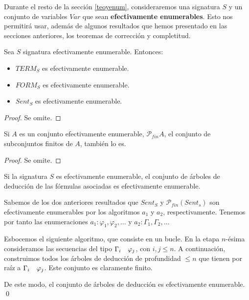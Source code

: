 Durante el resto de la sección \ref{teoyenum}, consideraremos una signatura $S$ y un conjunto de variables $Var$ que sean \textbf{efectivamente enumerables}. Esto nos permitirá usar, además de algunos resultados que hemos presentado en las secciones anteriores, los teoremas de corrección  y completitud.

\begin{lema*}\label{cosasenum}
Sea $S$ signatura efectivamente enumerable. Entonces:
\begin{itemize}
    \item $TERM_S$ es efectivamente enumerable.
    \item $FORM_S$ es efectivamente enumerable.
    \item $Sent_S$ es efectivamente enumerable.
\end{itemize}
\end{lema*}
\begin{proof}
Se omite.
\end{proof}

\begin{lema*}
Si $A$ es un conjunto efectivamente enumerable, $\mathcal{P}_{fin}A$, el conjunto de subconjuntos  finitos de $A$, también lo es.
\end{lema*}
\begin{proof}
Se omite.
\end{proof}

\begin{prop*}\label{arbenum}
Si la signatura $S$ es efectivamente enumerable, el conjunto de árboles de deducción de las fórmulas asociadas es efectivamente enumerable.
\end{prop*}
\begin{sketchproof}
Sabemos de los dos anteriores resultados que $Sent_S$ y $\mathcal{P}_{fin}(Sent_s)$ son efectivamente enumerables por los algoritmos $a_1$ y $a_2$, respectivamente. Tenemos por tanto las enumeraciones $a_1: \varphi_1, \varphi_2, \dots$ y $a_2: \Gamma_1, \Gamma_2, \dots$

Esbocemos el siguiente algoritmo, que consiste en un bucle. En la etapa $n$-ésima consideramos las secuencias del tipo $\Gamma_i \quad \varphi_j$, con $i, j \leq n$. A continuación, construimos todos los árboles de deducción de profundidad $\leq n$ que tienen por raíz a $\Gamma_i \quad \varphi_j$. Este conjunto es claramente finito.

De este modo, el conjunto de árboles de deducción es efectivamente enumerable.
\qed
\end{sketchproof}


